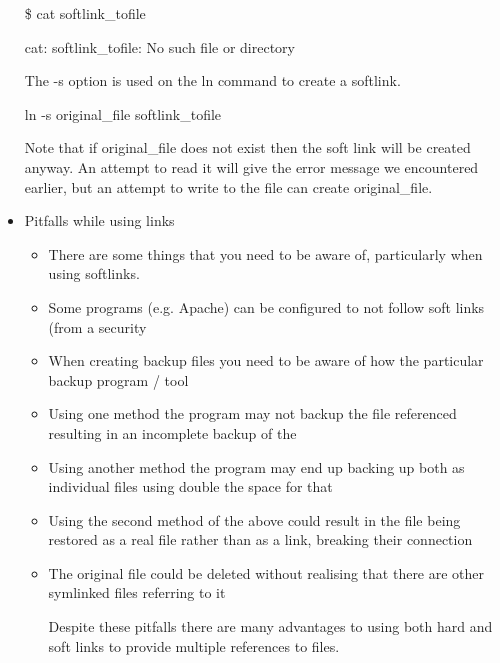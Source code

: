 \documentclass{article}
\begin{document}
\begin{itemize}
\hspace{10mm}\$ cat softlink\_tofile 

\hspace{10mm}cat: softlink\_tofile: No such file or directory

\hspace{10mm}The -s option is used on the ln command to create a softlink.

\hspace{10mm}ln -s original\_file softlink\_tofile

\hspace{10mm}Note that if original\_file does not exist then the soft link will be created anyway. An attempt to read it will give the error message we encountered earlier, but an attempt to write to the file can create original\_file.

\item Pitfalls while using links

\begin{itemize}
\item There are some things that you need to be aware of, particularly when using softlinks.

\item Some programs (e.g. Apache) can be configured to not follow soft links (from a security 

\item When creating backup files you need to be aware of how the particular backup program / tool 

\item Using one method the program may not backup the file referenced resulting in an incomplete backup of the 

\item Using another method the program may end up backing up both as individual files using double the space for that 

\item Using the second method of the above could result in the file being restored as a real file rather than as a link, breaking their connection

\item The original file could be deleted without realising that there are other symlinked files referring to it

Despite these pitfalls there are many advantages to using both hard and soft links to provide multiple references to files.
				
\end{itemize}
\end{itemize}
\end{document}
